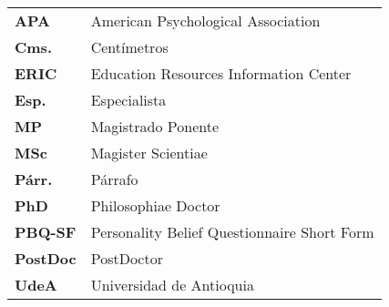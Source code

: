 \begin{tabular}{m{2.5cm}p{14cm}}
  \textbf{APA}      & American Psychological Association\\
  \textbf{Cms.}     & Centímetros\\
  \textbf{ERIC}     & Education Resources Information Center\\
  \textbf{Esp.}     & Especialista\\
  \textbf{MP}       & Magistrado Ponente\\
  \textbf{MSc}      & Magister Scientiae\\
  \textbf{Párr.}    & Párrafo\\
  \textbf{PhD}      & Philosophiae Doctor\\
  \textbf{PBQ-SF}   & Personality Belief Questionnaire Short Form\\
  \textbf{PostDoc}  & PostDoctor\\
  \textbf{UdeA}	    & Universidad de Antioquia
\end{tabular}
